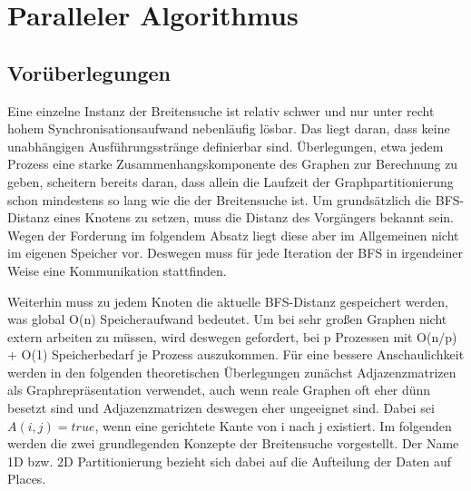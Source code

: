 \chapter{Paralleler Algorithmus} %
\label{cha:paralleler_algorithmus}

\section{Vorüberlegungen} %
\label{sec:vor_berlegungen}
Eine einzelne Instanz der Breitensuche ist relativ schwer und nur unter recht hohem Synchronisationsaufwand nebenläufig lösbar. Das liegt daran, dass keine unabhängigen Ausführungsstränge definierbar sind. Überlegungen, etwa jedem Prozess eine starke Zusammenhangskomponente des Graphen zur Berechnung zu geben, scheitern bereits daran, dass allein die Laufzeit der Graphpartitionierung schon mindestens so lang wie die der Breitensuche ist. Um grundsätzlich die BFS-Distanz eines Knotens zu setzen, muss die Distanz des Vorgängers bekannt sein. Wegen der Forderung im folgendem Absatz liegt diese aber im Allgemeinen nicht im eigenen Speicher vor. Deswegen muss für jede Iteration der BFS in irgendeiner Weise eine Kommunikation stattfinden.

Weiterhin muss zu jedem Knoten die aktuelle BFS-Distanz gespeichert werden, was global O(n) Speicheraufwand bedeutet. Um bei sehr großen Graphen nicht extern arbeiten zu müssen, wird deswegen gefordert, bei p Prozessen mit O(n/p) + O(1) Speicherbedarf je Prozess auszukommen. Für eine bessere Anschaulichkeit werden in den folgenden theoretischen Überlegungen zunächst Adjazenzmatrizen als Graphrepräsentation verwendet, auch wenn reale Graphen oft eher dünn besetzt sind und Adjazenzmatrizen deswegen eher ungeeignet sind. Dabei sei $A(i,j) = true$, wenn eine gerichtete Kante von i nach j existiert. Im folgenden werden die zwei grundlegenden Konzepte der Breitensuche \cite{Buluc:2011} vorgestellt. Der Name 1D bzw. 2D Partitionierung bezieht sich dabei auf die Aufteilung der Daten auf Places.

